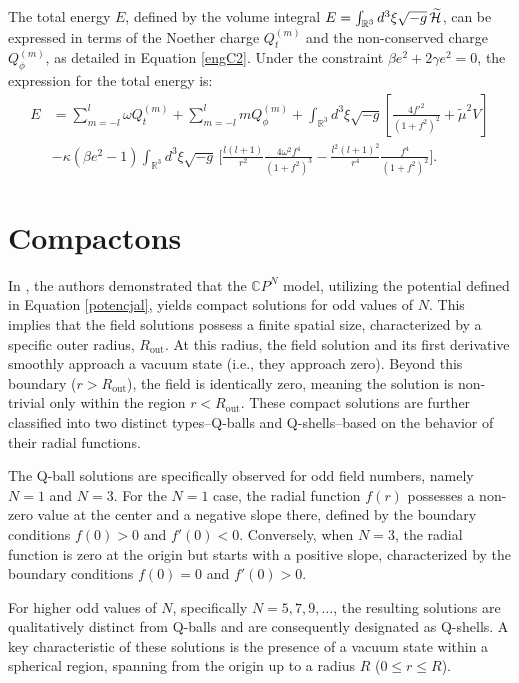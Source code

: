 \documentclass[aps,prd,superscriptaddress,notitlepage,11pt,final,longbibliography,nofootinbib]{revtex4-1}
\numberwithin{equation}{section}
\begin{document}
The total energy $E$, defined by the volume integral $E=\int_{{\mathbb{R}}^3}d^3\xi\sqrt{-g}\,\widetilde {\cal H}$, can be expressed in terms of the Noether charge $Q_t^{(m)}$ and the non-conserved charge $Q_\phi^{(m)}$, as detailed in Equation \eqref{engC2}. Under the constraint ${\beta e^2+2\gamma e^2=0}$, the expression for the total energy is:
\begin{align}
E&=\sum_{m=-l}^l\omega Q_t^{(m)}+\sum_{m=-l}^lm Q_\phi^{(m)}+\int_{{\mathbb{R}}^3}d^3\xi\sqrt{-g}\left[\frac{4f'^2}{(1+f^2)^2}+\tilde\mu^2V\right]\nonumber\\
&-\kappa(\beta e^2-1)\int_{{\mathbb{R}}^3}d^3\xi\sqrt{-g}\,\Bigg[\frac{l(l+1)}{r^2}\frac{4\omega^2f^4}{(1+f^2)^3}-\frac{l^2(l+1)^2}{r^4}\frac{f^4}{(1+f^2)^2}\Bigg].
\end{align}

\section{Compactons}
\label{sec4}

In \cite{Klimas:2017eft}, the authors demonstrated that the $\mathbb{C}P^N$ model, utilizing the potential defined in Equation \eqref{potencjal}, yields compact solutions for odd values of $N$. This implies that the field solutions possess a finite spatial size, characterized by a specific outer radius, $R_{\text{out}}$. At this radius, the field solution and its first derivative smoothly approach a vacuum state (i.e., they approach zero). Beyond this boundary ($r > R_{\text{out}}$), the field is identically zero, meaning the solution is non-trivial only within the region $r<R_{\text{out}}$. These compact solutions are further classified into two distinct types--Q-balls and Q-shells--based on the behavior of their radial functions.

The Q-ball solutions are specifically observed for odd field numbers, namely $N=1$ and $N=3$. For the $N=1$ case, the radial function $f(r)$ possesses a non-zero value at the center and a negative slope there, defined by the boundary conditions $f(0)>0$ and $f'(0)<0$. Conversely, when $N=3$, the radial function is zero at the origin but starts with a positive slope, characterized by the boundary conditions $f(0)=0$ and $f'(0)>0$.

For higher odd values of $N$, specifically $N=5, 7, 9, \ldots$, the resulting solutions are qualitatively distinct from Q-balls and are consequently designated as Q-shells. A key characteristic of these solutions is the presence of a vacuum state within a spherical region, spanning from the origin up to a radius $R$ ($0 \le r \le R$).
\end{document}
